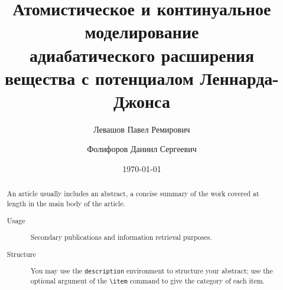 \documentclass[%
 reprint,
 amsmath,amssymb,
 aps,
]{revtex4-2}
\begin{document}

\title{
    Атомистическое и континуальное моделирование \\
    адиабатического расширения вещества с потенциалом Леннарда-Джонса
}%

\author{Левашов Павел Ремирович}
%

\author{Фолифоров Даниил Сергеевич}
%

\date{\today}%

\begin{abstract}
An article usually includes an abstract, a concise summary of the work
covered at length in the main body of the article. 
\begin{description}
\item[Usage]
Secondary publications and information retrieval purposes.
\item[Structure]
You may use the \texttt{description} environment to structure your abstract;
use the optional argument of the \verb+\item+ command to give the category of each item. 
\end{description}
\end{abstract}


\maketitle










\printglossaries


%
%
%
\end{document}
